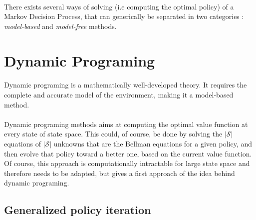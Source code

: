 \documentclass[a4paper]{report}
\begin{document}
{			\paragraph{} There exists several ways of solving (i.e computing the optimal policy) of a Markov Decision Process, that can generically be separated in two categories : \emph{model-based} and \emph{model-free} methods. 
		\section{Dynamic Programing}
		{
			\paragraph{} Dynamic programing is a mathematically well-developed theory. It requires the complete and accurate model of the environment, making it a model-based method. 
			
			\paragraph{} Dynamic programing methods aims at computing the optimal value function at every state of state space. This could, of course, be done by solving the $\vert \mathcal{S} \vert $ equations of $\vert \mathcal{S} \vert $ unknowns that are the Bellman equations for a given policy, and then evolve that policy toward a better one, based on the current value function. Of course, this approach is computationally intractable for large state space and therefore needs to be adapted, but gives a first approach of the idea behind dynamic programing. 
				
			\subsection{Generalized policy iteration}
			{
}}}
\end{document}
